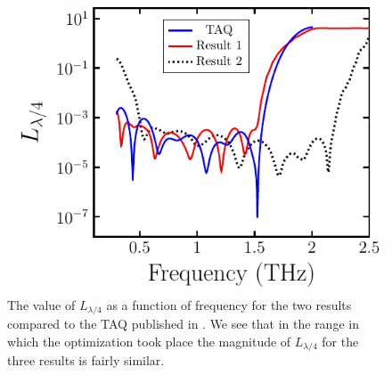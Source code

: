 
\begin{figure}[H]
    \centering
    \includegraphics[scale=0.78]{images/results/plots/ceramic/loss_function_a.pdf}
    \caption{The value of $L_{\lambda/4}$ as a function of frequency for the two results compared to the TAQ published in \cite{Masson2006}. We see that in the range in which the optimization took place the magnitude of $L_{\lambda/4}$ for the three results is fairly similar.}
    \label{fig:loss_function_cl4_a}
\end{figure}




